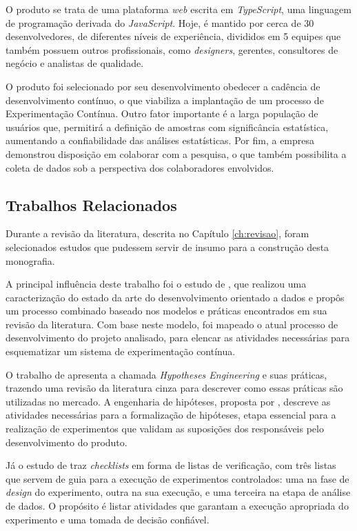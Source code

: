 O produto se trata de uma plataforma \textit{web} escrita em \textit{TypeScript}, uma linguagem de programação derivada do \textit{JavaScript}. Hoje, é mantido por cerca de 30 desenvolvedores, de diferentes níveis de experiência, divididos em 5 equipes que também possuem outros profissionais, como \textit{designers}, gerentes, consultores de negócio e analistas de qualidade.

O produto foi selecionado por seu desenvolvimento obedecer a cadência de desenvolvimento contínuo, o que viabiliza a implantação de um processo de Experimentação Contínua. Outro fator importante é a larga população de usuários que, permitirá a definição de amostras com significância estatística, aumentando a confiabilidade das análises estatísticas. Por fim, a empresa demonstrou disposição em colaborar com a pesquisa, o que também possibilita a coleta de dados sob a perspectiva dos colaboradores envolvidos.


\subsection{Trabalhos Relacionados}

Durante a revisão da literatura, descrita no Capítulo \ref{ch:revisao}, foram selecionados estudos que pudessem servir de insumo para a construção desta monografia.

A principal influência deste trabalho foi o estudo de , que realizou uma caracterização do estado da arte do desenvolvimento orientado a dados e propôs um processo combinado baseado nos modelos e práticas encontrados em sua revisão da literatura. Com base neste modelo, foi mapeado o atual processo de desenvolvimento do projeto analisado, para elencar as atividades necessárias para esquematizar um sistema de experimentação contínua.

O trabalho de  apresenta a chamada \textit{Hypotheses Engineering} e suas práticas, trazendo uma revisão da literatura cinza para descrever como essas práticas são utilizadas no mercado. A engenharia de hipóteses, proposta por , descreve as atividades necessárias para a formalização de hipóteses, etapa essencial para a realização de experimentos que validam as suposições dos responsáveis pelo desenvolvimento do produto.

Já o estudo de \cite{fabijan_three_2019} traz \textit{checklists} em forma de listas de verificação, com três listas que servem de guia para a execução de experimentos controlados: uma na fase de \textit{design} do experimento, outra na sua execução, e uma terceira na etapa de análise de dados. O propósito é listar atividades que garantam a execução apropriada do experimento e uma tomada de decisão confiável.

